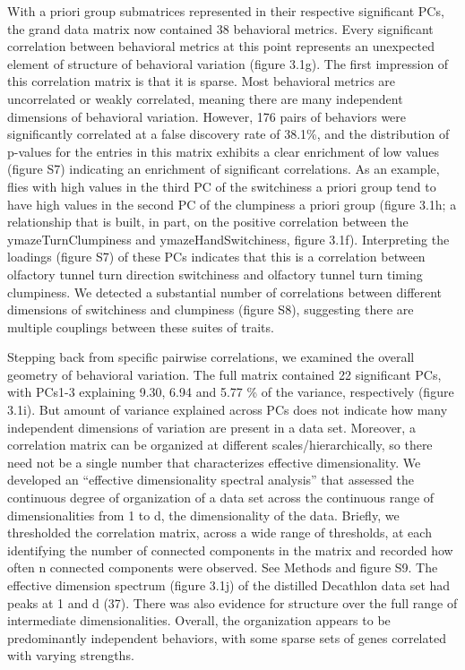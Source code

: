\documentclass[12pt,letterpaper]{article}
\begin{document}
With a priori group submatrices represented in their respective significant PCs, the grand data matrix now contained 38 behavioral metrics. Every significant correlation between behavioral metrics at this point represents an unexpected element of structure of behavioral variation (figure 3.1g). The first impression of this correlation matrix is that it is sparse. Most behavioral metrics are uncorrelated or weakly correlated, meaning there are many independent dimensions of behavioral variation. However, 176 pairs of behaviors were significantly correlated at a false discovery rate of 38.1\%, and the distribution of p-values for the entries in this matrix exhibits a clear enrichment of low values (figure S7) indicating an enrichment of significant correlations. As an example, flies with high values in the third PC of the switchiness a priori group tend to have high values in the second PC of the clumpiness a priori group (figure 3.1h; a relationship that is built, in part, on the positive correlation between the ymazeTurnClumpiness and ymazeHandSwitchiness, figure 3.1f). Interpreting the loadings (figure S7) of these PCs indicates that this is a correlation between olfactory tunnel turn direction switchiness and olfactory tunnel turn timing clumpiness. We detected a substantial number of correlations between different dimensions of switchiness and clumpiness (figure S8), suggesting there are multiple couplings between these suites of traits. 

Stepping back from specific pairwise correlations, we examined the overall geometry of behavioral variation. The full matrix contained 22 significant PCs, with PCs1-3 explaining 9.30, 6.94 and 5.77 \% of the variance, respectively (figure 3.1i). But amount of variance explained across PCs does not indicate how many independent dimensions of variation are present in a data set. Moreover, a correlation matrix can be organized at different scales/hierarchically, so there need not be a single number that characterizes effective dimensionality. We developed an “effective dimensionality spectral analysis” that assessed the continuous degree of organization of a data set across the continuous range of dimensionalities from 1 to d, the dimensionality of the data. Briefly, we thresholded the correlation matrix, across a wide range of thresholds, at each identifying the number of connected components in the matrix and recorded how often n connected components were observed. See Methods and figure S9. The effective dimension spectrum (figure 3.1j) of the distilled Decathlon data set had peaks at 1 and d (37). There was also evidence for structure over the full range of intermediate dimensionalities. Overall, the organization appears to be predominantly independent behaviors, with some sparse sets of genes correlated with varying strengths. 
\end{document}
